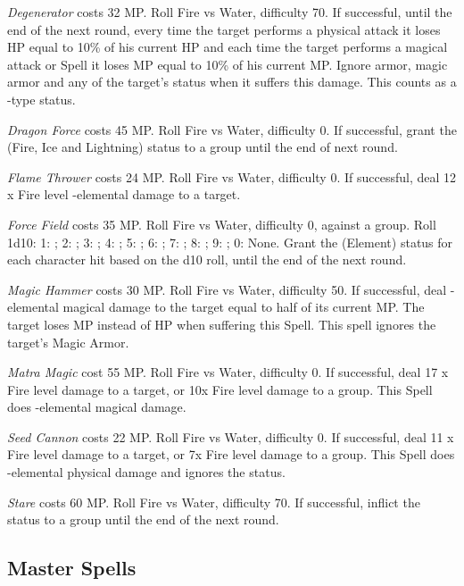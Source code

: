 \begin{multicols}{2}
    \textit{Degenerator} costs 32 MP\@. Roll Fire vs Water, difficulty 70. If successful, until the end of the next round, every time the target performs a physical attack it loses HP equal to 10\% of his current HP and each time the target performs a magical attack or Spell it loses MP equal to 10\% of his current MP\@. Ignore armor, magic armor and any of the target’s status when it suffers this damage. This counts as a -type status.
    
    \textit{Dragon Force} costs 45 MP\@. Roll Fire vs Water, difficulty 0. If successful, grant the  (Fire, Ice and Lightning) status to a group until the end of next round.
    
    \textit{Flame Thrower} costs 24 MP\@. Roll Fire vs Water, difficulty 0. If successful, deal 12 x Fire level -elemental damage to a target.
    
	\textit{Force Field} costs 35 MP\@. Roll Fire vs Water, difficulty 0, against a group. Roll 1d10: 1: ; 2: ; 3: ; 4: ; 5: ; 6: ; 7: ; 8: ; 9: ; 0: None. Grant the (Element)  status for each character hit based on the d10 roll, until the end of the next round.
    
    \textit{Magic Hammer} costs 30 MP\@. Roll Fire vs Water, difficulty 50. If successful, deal -elemental magical damage to the target equal to half of its current MP\@. The target loses MP instead of HP when suffering this Spell. This spell ignores the target’s Magic Armor.
    
    \textit{Matra Magic} cost 55 MP\@. Roll Fire vs Water, difficulty 0. If successful, deal 17 x Fire level damage to a target, or 10x Fire level damage to a group. This Spell does -elemental magical damage.

    \textit{Seed Cannon} costs 22 MP\@. Roll Fire vs Water, difficulty 0. If successful, deal 11 x Fire level damage to a target, or 7x Fire level damage to a group. This Spell does -elemental physical damage and ignores the  status.
    
    \textit{Stare} costs 60 MP\@. Roll Fire vs Water, difficulty 70. If successful, inflict the  status to a group until the end of the next round.
    
\subsection{Master Spells}\label{subsec:blue-master}


\end{multicols}
